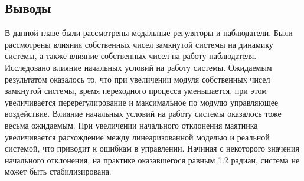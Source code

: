 \FloatBarrier
\subsection{Выводы} 
В данной главе были рассмотрены модальные регуляторы и наблюдатели. Были рассмотрены влияния собственных 
чисел замкнутой системы на динамику системы, а также влияние собственных чисел на работу наблюдателя. 
Исследовано влияние начальных условий на работу системы. Ожидаемым результатом оказалось то, что 
при увеличении модуля собственных чисел замкнутой системы, время переходного процесса уменьшается, 
при этом увеличивается перерегулирование и максимальное по модулю управляющее воздействие. 
Влияние начальных условий на работу системы оказалось тоже весьма ожидаемым. При увеличении 
начального отклонения маятника увеличивается расхождение между линеаризованной моделью и реальной системой, 
что приводит к ошибкам в управлении. Начиная с некоторого значения начального отклонения, 
на практике оказавшегося равным 1.2 радиан, система не может быть стабилизирована. 